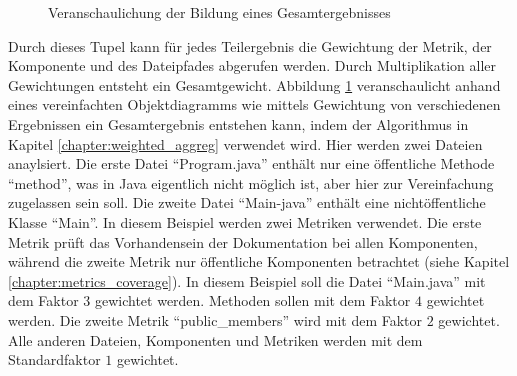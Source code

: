 \begin{figure}[h!]
     
     \caption{ Veranschaulichung der Bildung eines Gesamtergebnisses}
     \label{fig:metric_weighting}
 \end{figure}
Durch dieses Tupel kann für jedes Teilergebnis die Gewichtung der Metrik, der Komponente und des Dateipfades  abgerufen werden. Durch Multiplikation  aller Gewichtungen entsteht ein Gesamtgewicht. Abbildung \ref{fig:metric_weighting} veranschaulicht anhand eines vereinfachten Objektdiagramms wie mittels Gewichtung von verschiedenen Ergebnissen ein Gesamtergebnis entstehen kann, indem der Algorithmus in Kapitel \ref{chapter:weighted_aggreg} verwendet wird. Hier werden zwei Dateien anaylsiert. Die erste Datei \enquote{Program.java} enthält nur eine öffentliche Methode \enquote{method}, was in Java eigentlich nicht möglich ist, aber hier zur Vereinfachung zugelassen sein soll. Die zweite Datei \enquote{Main-java} enthält eine nichtöffentliche Klasse \enquote{Main}. In diesem Beispiel werden zwei Metriken verwendet. Die erste Metrik prüft das Vorhandensein der Dokumentation bei allen Komponenten, während die zweite Metrik nur öffentliche Komponenten betrachtet (siehe Kapitel \ref{chapter:metrics_coverage}). In diesem Beispiel soll die Datei \enquote{Main.java} mit dem Faktor $3$ gewichtet werden. Methoden sollen mit dem Faktor $4$ gewichtet werden. Die zweite Metrik \enquote{public\_members} wird mit dem Faktor $2$ gewichtet. Alle anderen Dateien, Komponenten und Metriken werden mit dem Standardfaktor $1$ gewichtet.

